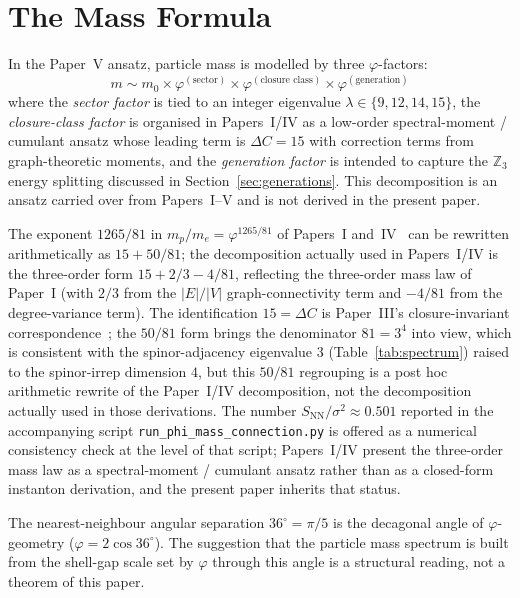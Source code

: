 \documentclass[12pt]{article}
\begin{document}
\section{The Mass Formula}\label{sec:mass}

In the Paper~V ansatz, particle mass is modelled by three $\varphi$-factors:
\begin{equation}\label{eq:mass}
    m \sim m_0 \times \varphi^{(\text{sector})} \times \varphi^{(\text{closure class})} \times \varphi^{(\text{generation})}
\end{equation}
where the \textit{sector factor} is tied to an integer eigenvalue $\lambda \in \{9, 12, 14, 15\}$, the \textit{closure-class factor} is organised in Papers~I/IV as a low-order spectral-moment / cumulant ansatz whose leading term is $\Delta C = 15$ with correction terms from graph-theoretic moments, and the \textit{generation factor} is intended to capture the $\mathbb{Z}_3$ energy splitting discussed in Section~\ref{sec:generations}. This decomposition is an ansatz carried over from Papers~I--V and is not derived in the present paper.

The exponent $1265/81$ in $m_p/m_e = \varphi^{1265/81}$ of Papers~I and~IV~\citep{SmartI, SmartIV} can be rewritten arithmetically as $15 + 50/81$; the decomposition actually used in Papers~I/IV is the three-order form $15 + 2/3 - 4/81$, reflecting the three-order mass law of Paper~I (with $2/3$ from the $|E|/|V|$ graph-connectivity term and $-4/81$ from the degree-variance term). The identification $15 = \Delta C$ is Paper~III's closure-invariant correspondence~\citep{SmartIII}; the $50/81$ form brings the denominator $81 = 3^4$ into view, which is consistent with the spinor-adjacency eigenvalue $3$ (Table~\ref{tab:spectrum}) raised to the spinor-irrep dimension $4$, but this $50/81$ regrouping is a post hoc arithmetic rewrite of the Paper~I/IV decomposition, not the decomposition actually used in those derivations. The number $S_{\mathrm{NN}}/\sigma^2 \approx 0.501$ reported in the accompanying script \texttt{run\_phi\_mass\_connection.py} is offered as a numerical consistency check at the level of that script; Papers~I/IV present the three-order mass law as a spectral-moment / cumulant ansatz rather than as a closed-form instanton derivation, and the present paper inherits that status.

The nearest-neighbour angular separation $36^\circ = \pi/5$ is the decagonal angle of $\varphi$-geometry ($\varphi = 2\cos 36^\circ$). The suggestion that the particle mass spectrum is built from the shell-gap scale set by $\varphi$ through this angle is a structural reading, not a theorem of this paper.
\end{document}
